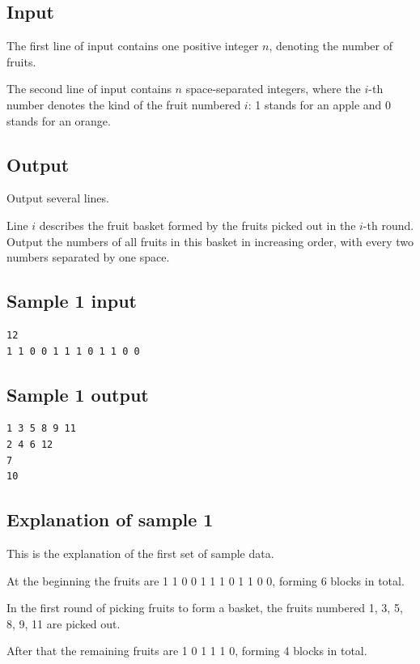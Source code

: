 \documentclass[11pt]{article}
\begin{document}
\subsection*{Input}

The first line of input contains one positive integer $n$, denoting the
number of fruits.

The second line of input contains $n$ space-separated integers, where the
$i$-th number denotes the kind of the fruit numbered $i$:
1 stands for an apple and 0 stands for an orange.

\subsection*{Output}

Output several lines.

Line $i$ describes the fruit basket formed by the fruits picked out in the
$i$-th round.
Output the numbers of all fruits in this basket in increasing order,
with every two numbers separated by one space.

\subsection*{Sample 1 input}

\begin{verbatim}
12
1 1 0 0 1 1 1 0 1 1 0 0
\end{verbatim}

\subsection*{Sample 1 output}

\begin{verbatim}
1 3 5 8 9 11
2 4 6 12
7
10
\end{verbatim}

\subsection*{Explanation of sample 1}

This is the explanation of the first set of sample data.

At the beginning the fruits are 1 1 0 0 1 1 1 0 1 1 0 0, forming 6 blocks
in total.

In the first round of picking fruits to form a basket, the fruits numbered
1, 3, 5, 8, 9, 11 are picked out.

After that the remaining fruits are 1 0 1 1 1 0, forming 4 blocks in total.
\end{document}
